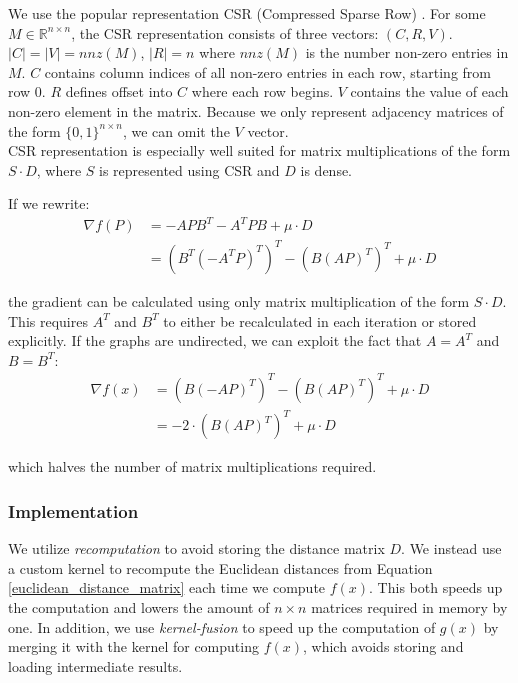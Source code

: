We use the popular representation CSR (Compressed Sparse Row) \citep{tinney1967csr}. For some $M \in \mathds{R}^{n \times n}$, the CSR representation consists of three vectors: $(C, R, V)$. $|C| = |V| = nnz(M)$, $|R| = n$ where $nnz(M)$ is the number non-zero entries in $M$. $C$ contains column indices of all non-zero entries in each row, starting from row 0. $R$ defines offset into $C$ where each row begins. $V$ contains the value of each non-zero element in the matrix. Because we only represent adjacency matrices of the form $\{0, 1\}^{n \times n}$, we can omit the $V$ vector.\\

CSR representation is especially well suited for matrix multiplications of the form $S \cdot D$, where $S$ is represented using CSR and $D$ is dense.

If we rewrite:
\begin{equation}
    \begin{split}
    \nabla f(P) &= -APB^T - A^TPB + \mu \cdot D\\
    &= (B^T(-A^TP)^T)^T - (B(AP)^T)^T + \mu \cdot D
    \end{split}
\end{equation}

the gradient can be calculated using only matrix multiplication of the form $S \cdot D$. This requires $A^T$ and $B^T$ to either be recalculated in each iteration or stored explicitly. If the graphs are undirected, we can exploit the fact that $A = A^T$ and $B = B^T$:
\begin{equation}
    \begin{split}
    \nabla f(x) &= (B(-AP)^T)^T - (B(AP)^T)^T + \mu \cdot D\\
    &= -2 \cdot (B (A P)^T)^T + \mu \cdot D
    \end{split}
\end{equation}

which halves the number of matrix multiplications required.

\subsubsection{Implementation}
We utilize \textit{recomputation} to avoid storing the distance matrix $D$. We instead use a custom kernel to recompute the Euclidean distances from Equation \ref{euclidean_distance_matrix} each time we compute $f(x)$. This both speeds up the computation and lowers the amount of $n \times n$ matrices required in memory by one. In addition, we use \textit{kernel-fusion} to speed up the computation of $g(x)$ by merging it with the kernel for computing $f(x)$, which avoids storing and loading intermediate results.

